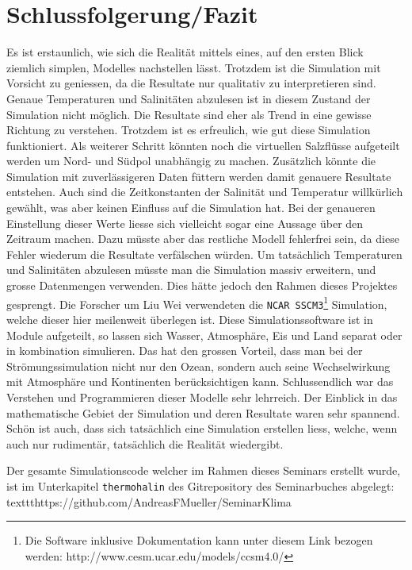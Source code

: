 \section{Schlussfolgerung/Fazit}

Es ist erstaunlich, wie sich die Realität mittels eines, auf den ersten Blick ziemlich simplen, Modelles nachstellen lässt. Trotzdem ist die Simulation mit Vorsicht zu geniessen, da die Resultate nur qualitativ zu interpretieren sind. Genaue Temperaturen und Salinitäten abzulesen ist in diesem Zustand der Simulation nicht möglich. Die Resultate sind eher als Trend in eine gewisse Richtung zu verstehen. Trotzdem ist es erfreulich, wie gut diese Simulation funktioniert. 
Als weiterer Schritt könnten noch die virtuellen Salzflüsse aufgeteilt werden um Nord- und Südpol unabhängig zu machen. Zusätzlich könnte die Simulation mit zuverlässigeren Daten füttern werden damit genauere Resultate entstehen. Auch sind die Zeitkonstanten der Salinität und Temperatur willkürlich gewählt, was aber keinen Einfluss auf die Simulation hat. Bei der genaueren Einstellung dieser Werte liesse sich vielleicht sogar eine Aussage über den Zeitraum machen. Dazu müsste aber das restliche Modell fehlerfrei sein, da diese Fehler wiederum die Resultate verfälschen würden.
Um tatsächlich Temperaturen und Salinitäten abzulesen müsste man die Simulation massiv erweitern, und grosse Datenmengen verwenden. Dies hätte jedoch den Rahmen dieses Projektes gesprengt. 
Die Forscher um Liu Wei \cite{thermohalin:liuwei} verwendeten die \texttt{NCAR SSCM3}\footnote{Die Software inklusive Dokumentation kann unter diesem Link bezogen werden: http://www.cesm.ucar.edu/models/ccsm4.0/} Simulation, welche dieser hier meilenweit überlegen ist. Diese Simulationssoftware ist in Module aufgeteilt, so lassen sich Wasser, Atmosphäre, Eis und Land separat oder in kombination simulieren. Das hat den grossen Vorteil, dass man bei der Strömungssimulation nicht nur den Ozean, sondern auch seine Wechselwirkung mit Atmosphäre und Kontinenten berücksichtigen kann. 
Schlussendlich war das Verstehen und Programmieren dieser Modelle sehr lehrreich. Der Einblick in das mathematische Gebiet der Simulation und deren Resultate waren sehr spannend. Schön ist auch, dass sich tatsächlich eine Simulation erstellen liess, welche, wenn auch nur rudimentär, tatsächlich die Realität wiedergibt.

Der gesamte Simulationscode welcher im Rahmen dieses Seminars erstellt wurde, ist im Unterkapitel \texttt{thermohalin} des Gitrepository des Seminarbuches abgelegt: texttt{https://github.com/AndreasFMueller/SeminarKlima}
